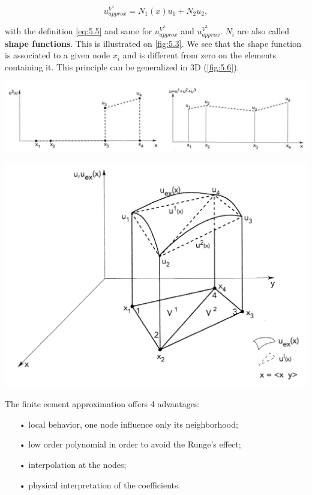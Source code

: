 	\begin{equation}
	u_{approx}^{V^1} = N_1(x) u_1 + N_2 u_2,
	\end{equation}
	
	with the definition \eqref{eq:5.5} and same for $u_{approx}^{V^2}$ and $u_{approx}^{V^3}$. $N_i$ are also called \textbf{shape functions}. This is illustrated on \autoref{fig:5.3}. We see that the shape function is associated to a given node $x_i$ and is different from zero on the elements containing it. This principle can be generalized in 3D (\autoref{fig:5.6}). 
	
	\begin{center}
	\begin{minipage}{0.5\textwidth}
	\includegraphics[scale=0.3]{ch5/5}
	\label{fig:5.5}
	\end{minipage}
	\begin{minipage}{0.45\textwidth}
	\includegraphics[scale=0.26]{ch5/6}
	\label{fig:5.6}
	\end{minipage}
	\end{center}
	
	The finite eement approximation offers 4 advantages:
	
	\begin{itemize}
	\item[•] local behavior, one node influence only its neighborhood;
	\item[•] low order polynomial in order to avoid the Runge's effect;
	\item[•] interpolation at the nodes;
	\item[•] physical interpretation of the coefficients.
	\end{itemize}
	
